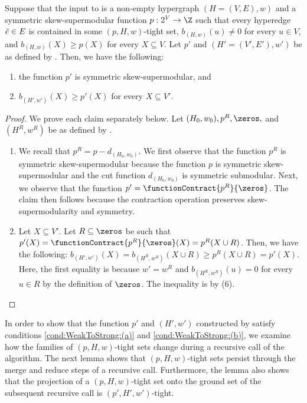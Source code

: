 \begin{lemma}\label{lem:weak-to-strong-cover:next-recursive-call-hypothesis-satification:symm-skew-supermod-strong-cover}
Suppose that the input to  is a non-empty hypergraph $(H = (V, E), w)$ and a symmetric skew-supermodular function $p:2^V\rightarrow \Z$ %
such that every hyperedge $\Tilde{e} \in E$ is contained in some $(p, H, w)$-tight set, $b_{(H,w)}(u) \not = 0$ for every $u \in V$, and $b_{(H,w)}(X) \geq p(X)$ for every $X \subseteq V$. 
Let $p'$ and $(H' = (V', E'), w')$ be as defined by . Then, we have the following:
\begin{enumerate}
    \item the function $p'$ is symmetric skew-supermodular, and
    \item $b_{(H', w')}(X) \geq p'(X)$ for every $X \subseteq V'$.
\end{enumerate}
\end{lemma}
\begin{proof} We prove each claim separately below. Let $(H_0, w_0), p^R, \zeros,$ and $(H^R, w^R)$ be as defined by .
\begin{enumerate}
    \item We recall that $p^R =  p - d_{(H_0, w_0)}$. We first observe that the function $p^R$ is symmetric skew-supermodular because the function $p$ is symmetric skew-supermodular and the cut function $d_{(H_0, w_0)}$ is symmetric submodular. Next, we observe that the function $p' = \functionContract{p^R}{\zeros}$. The claim then follows because the contraction operation preserves skew-supermodularity and symmetry.
    \item Let $X \subseteq V'$. Let $R \subseteq \zeros$ be such that $p'(X) = \functionContract{p^R}{\zeros}(X) = p^R(X \cup R)$. Then, we have the following: $b_{(H', w')}(X) = b_{(H^R, w^R)}(X \cup R) \geq p^R(X \cup R) = p'(X)$. Here, the first equality is because $w' = w^R$ and $b_{(H^R, w^R)}(u) = 0$ for every $u \in R$ by the definition of $\zeros$. The inequality is by (6).  
\end{enumerate}
\end{proof}

In order to show that the function $p'$ and $(H',w')$ constructed by  satisfy conditions \ref{cond:WeakToStrong:(a)} and \ref{cond:WeakToStrong:(b)}, we examine how the families of $(p, H, w)$-tight sets change during a recursive call of the algorithm. 
The next lemma shows that $(p, H, w)$-tight sets persist through the merge and reduce steps of a recursive call. Furthermore, the lemma also shows that the projection of a $(p, H, w)$-tight set onto the ground set of the subsequent recursive call is  $(p', H', w')$-tight.

